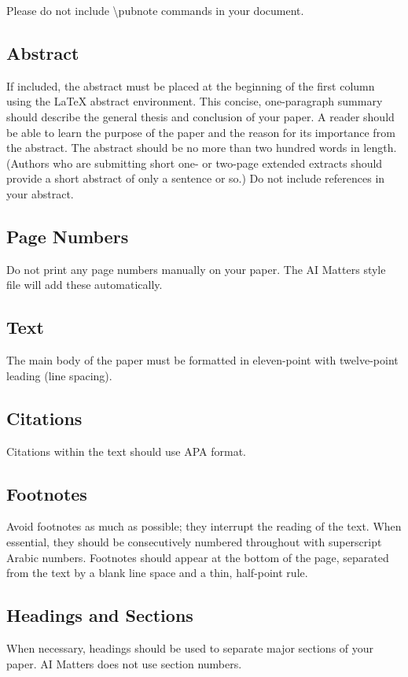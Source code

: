 \documentclass[letterpaper]{article}
\begin{document}
Please do not include \textbackslash pubnote commands in your document.

\subsection{Abstract}
If included, the abstract must be placed at the beginning of the first column using the \LaTeX{} abstract environment.  This concise, one-paragraph summary should describe the general thesis and conclusion of your paper. A reader should be able to learn the purpose of the paper and the reason for its importance from the abstract. The abstract should be no more than two hundred words in length. (Authors who are submitting short one- or two-page extended extracts should provide a short abstract of only a sentence or so.) Do not include references in your abstract.

\subsection{Page Numbers}

Do not print any page numbers manually on your paper.  The AI Matters style file will add these automatically.

\subsection{Text }
The main body of the paper must be formatted in eleven-point with twelve-point leading (line spacing).

\subsection{Citations}
Citations within the text should use APA format.

\subsection{Footnotes}
Avoid footnotes as much as possible; they interrupt the reading of the text. When essential, they should be consecutively numbered throughout with superscript Arabic numbers. Footnotes should appear at the bottom of the page, separated from the text by a blank line space and a thin, half-point rule. 

\subsection{Headings and Sections}
When necessary, headings should be used to separate major sections of your paper.   AI Matters does not use section numbers.
\end{document}

